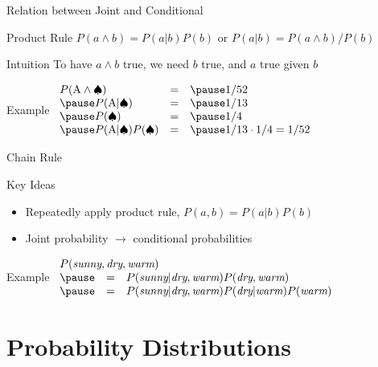 \documentclass[12pt]{beamer}
\newcommand{\EM}[1]{\mbox{\em#1}}
\begin{document}
\begin{frame}{Relation between Joint and Conditional}
	\begin{block}{Product Rule}
		$P(a \land b) = P(a|b)P(b)$ \hfill or \hfill $P(a|b) = P(a \land b)/P(b)$
	\end{block}
	\pause
	\begin{block}{Intuition}
		To have $a \land b$ true, we need $b$ true, and $a$ true given $b$
	\end{block}
	\pause
	\begin{block}{Example}
		$
		\begin{array}{lll}
			P(\mbox{A} \land \spadesuit)        & = & \pause 1/52 \\
			\pause
			P(\mbox{A}|\spadesuit)              & = & \pause 1/13 \\
			\pause
			P(\spadesuit)                       & = & \pause 1/4  \\
			\pause
			P(\mbox{A}|\spadesuit)P(\spadesuit) & = & \pause 1/13 \cdot 1/4 = 1/52 \\
		\end{array}
		$
	\end{block}
\end{frame}
\begin{frame}{Chain Rule}
	\begin{block}{Key Ideas}
		\begin{itemize}
			\item Repeatedly apply product rule, $P(a,b) = P(a|b)P(b)$
			\item Joint probability $\rightarrow$ conditional probabilities
		\end{itemize}
	\end{block}
	\pause
	\begin{block}{Example}
		$
		\begin{array}{lll}
		\lefteqn{P(\EM{sunny}, \EM{dry}, \EM{warm})} \\
		\pause
		& = & P(\EM{sunny}|\EM{dry}, \EM{warm})P(\EM{dry}, \EM{warm})\\
		\pause
		& = & P(\EM{sunny}|\EM{dry}, \EM{warm})P(\EM{dry}|\EM{warm})P(\EM{warm}) \\
		\end{array}
		$
	\end{block}
\end{frame}


\section{Probability Distributions}
\end{document}
